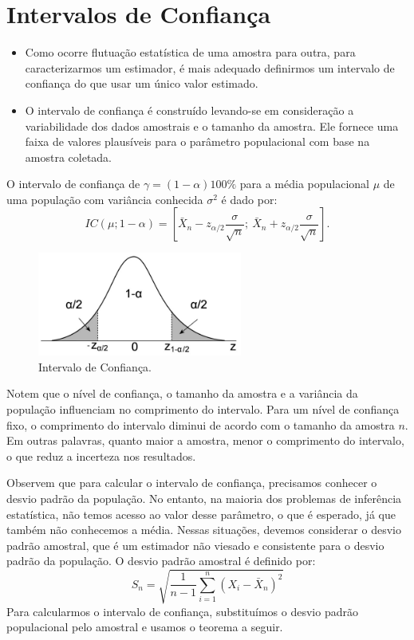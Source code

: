\documentclass{article}
\begin{document}
\section{Intervalos de Confiança}
\begin{itemize}
    \item Como ocorre flutuação estatística de uma amostra para outra, para caracterizarmos um estimador, é mais adequado definirmos um intervalo de confiança do que usar um único valor estimado.
    \item O intervalo de confiança é construído levando-se em consideração a variabilidade dos dados amostrais e o tamanho da amostra. Ele fornece uma faixa de valores plausíveis para o parâmetro populacional com base na amostra coletada.
\end{itemize}

O intervalo de confiança de $\gamma = (1 - \alpha)100\%$ para a média populacional $\mu$ de uma população com variância conhecida $\sigma^2$ é dado por:
    $$
    IC(\mu; 1 - \alpha) =
    \left[
    \bar{X}_n - z_{\alpha/2}\frac{\sigma}{\sqrt{n}};\ 
    \bar{X}_n + z_{\alpha/2}\frac{\sigma}{\sqrt{n}}
    \right].
    $$

\begin{figure}[H]
    \centering
    \includegraphics[width=0.6\textwidth]{figuras/intervalo_confianca.png}
    \caption{Intervalo de Confiança.}
    \label{fig:intervalo_confianca}
\end{figure}

Notem que o nível de confiança, o tamanho da amostra e a variância da população influenciam no comprimento do intervalo.
Para um nível de confiança fixo, o comprimento do intervalo diminui de acordo com o tamanho da amostra $n$.
Em outras palavras, quanto maior a amostra, menor o comprimento do intervalo, o que reduz a incerteza nos resultados.

Observem que para calcular o intervalo de confiança, precisamos conhecer o desvio padrão da população. No entanto, na maioria dos problemas de inferência estatística, não temos acesso ao valor desse parâmetro, o que é esperado, já que também não conhecemos a média. Nessas situações, devemos considerar o desvio padrão amostral, que é um estimador não viesado e consistente para o desvio padrão da população. 
O desvio padrão amostral é definido por:
    $$
    S_n = \sqrt{\frac{1}{n-1} \sum_{i=1}^n (X_i - \bar{X}_n)^2}
    $$
Para calcularmos o intervalo de confiança, substituímos o desvio padrão populacional pelo amostral e usamos o teorema a seguir.
\end{document}
